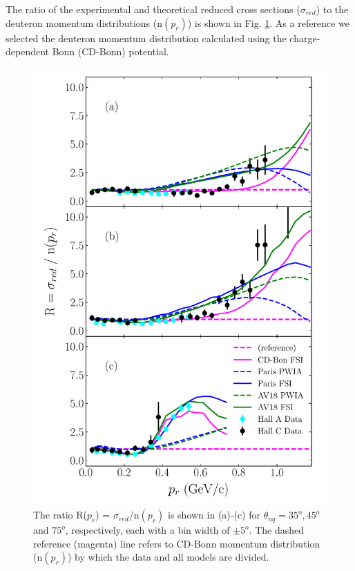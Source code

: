 \indent The ratio of the experimental and theoretical reduced cross sections ($\sigma_{red}$) to the deuteron momentum distributions (n$(p_{r})$) is shown in Fig. \ref{fig:fig2}. As a reference we selected the
deuteron momentum distribution calculated using the charge-dependent Bonn (CD-Bonn) potential\cite{PhysRevC.63.024001}.
\begin{figure}[h!]
\includegraphics[scale=0.5]{../prl_plots/PRL_plot2.pdf}
\caption{The ratio R($p_{r}$) = $\sigma_{red}$/n$(p_{r})$ is shown in (a)-(c) for $\theta_{nq}=35^{o}, 45^{o}$ and $75^{o}$, respectively, each with a bin width of $\pm 5^{o}$. The dashed reference (magenta) line refers to CD-Bonn momentum distribution (n$(p_{r})$) by which the data and all models are divided. }
\label{fig:fig2}
\end{figure} \\
